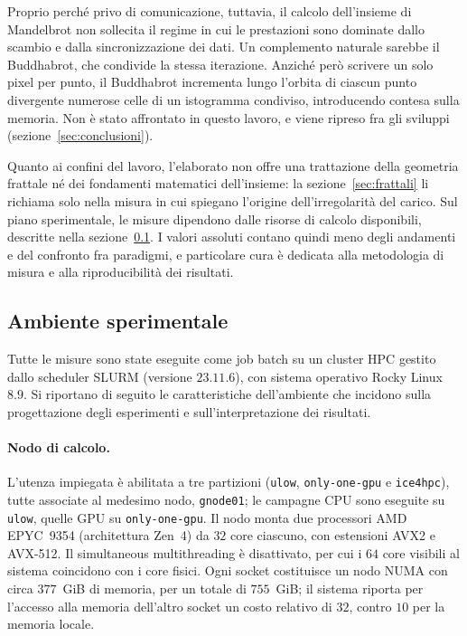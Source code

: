 Proprio perché privo di comunicazione, tuttavia, il calcolo dell'insieme di Mandelbrot non sollecita
il regime in cui le prestazioni sono dominate dallo scambio e dalla sincronizzazione dei dati.
Un complemento naturale sarebbe il Buddhabrot, che condivide la stessa iterazione. Anziché però scrivere un solo pixel per punto,
il Buddhabrot incrementa lungo l'orbita di ciascun punto divergente numerose celle di un istogramma condiviso, introducendo contesa sulla memoria.
Non è stato affrontato in questo lavoro, e viene ripreso fra gli sviluppi (sezione~\ref{sec:conclusioni}).

Quanto ai confini del lavoro, l'elaborato non offre una trattazione della geometria frattale né dei fondamenti matematici dell'insieme: la sezione~\ref{sec:frattali} li richiama solo nella misura in cui spiegano l'origine dell'irregolarità del carico.
Sul piano sperimentale, le misure dipendono dalle risorse di calcolo disponibili, descritte nella sezione~\ref{sec:ambiente}. I valori assoluti contano quindi meno degli andamenti e del confronto fra paradigmi, e particolare cura è dedicata alla metodologia di misura e alla riproducibilità dei risultati.

\subsection{Ambiente sperimentale}
\label{sec:ambiente}

Tutte le misure sono state eseguite come job batch su un cluster HPC gestito
dallo scheduler SLURM (versione $23.11.6$), con sistema operativo Rocky
Linux~$8.9$. Si riportano di seguito le caratteristiche dell'ambiente che
incidono sulla progettazione degli esperimenti e sull'interpretazione dei
risultati.

\paragraph{Nodo di calcolo.}
L'utenza impiegata è abilitata a tre partizioni (\texttt{ulow},
\texttt{only-one-gpu} e \texttt{ice4hpc}), tutte associate al medesimo nodo,
\texttt{gnode01}; le campagne CPU sono eseguite su \texttt{ulow}, quelle GPU su
\texttt{only-one-gpu}. Il nodo monta due processori AMD EPYC~9354 (architettura
Zen~4) da $32$ core ciascuno, con estensioni AVX2 e AVX-512. Il simultaneous
multithreading è disattivato, per cui i $64$ core visibili al sistema
coincidono con i core fisici. Ogni socket costituisce un nodo NUMA con circa
$377$~GiB di memoria, per un totale di $755$~GiB; il sistema riporta per
l'accesso alla memoria dell'altro socket un costo relativo di $32$, contro $10$
per la memoria locale.

